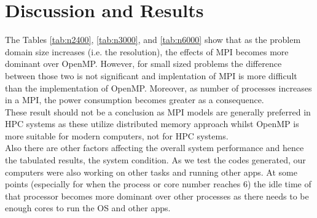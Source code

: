 \documentclass[12pt]{article}
\begin{document}
\section{Discussion and Results}
The Tables \ref{tab:n2400}, \ref{tab:n3000}, and \ref{tab:n6000} show that as the problem domain size increases (i.e. the resolution), the effects of MPI becomes more dominant over OpenMP. However, for small sized problems the difference between those two is not significant and implentation of MPI is more difficult than the implementation of OpenMP. Moreover, as number of processes increases in a MPI, the power consumption becomes greater as a consequence.\\
These result should not be a conclusion as MPI models are generally preferred in HPC systems as these utilize distributed memory approach whilst OpenMP is more suitable for modern computers, not for HPC systems.\\
Also there are other factors affecting the overall system performance and hence the tabulated results, the system condition. As we test the codes generated, our computers were also working on other tasks and running other apps. At some points (especially for when the process or core number reaches 6) the idle time of that processor becomes more dominant over other processes as there needs to be enough cores to run the OS and other apps.
\begin{table}[h!]
\centering
\caption{Computational performance comparison between MPI and OpenMP\\ Total Nodes: 2400}
\label{tab:my_label}
\end{table}


\begin{table}[h!]
\centering
\caption{Computational performance comparison between MPI and OpenMP\\ Total Nodes: 3000}
\label{tab:my_label}
\end{table}
\end{document}

